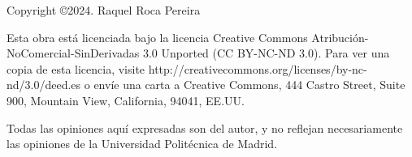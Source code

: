\begin{flushleft}

Copyright \copyright  2024. Raquel Roca Pereira


Esta obra está licenciada bajo la licencia Creative Commons Atribución-NoComercial-SinDerivadas 3.0 Unported (CC BY-NC-ND 3.0). Para ver una copia de esta licencia, visite http://creativecommons.org/licenses/by-nc-nd/3.0/deed.es o envíe una carta a Creative Commons, 444 Castro Street, Suite 900, Mountain View, California, 94041, EE.UU.

Todas las opiniones aquí expresadas son del autor, y no reflejan necesariamente las opiniones
de la Universidad Politécnica de Madrid.

\end{flushleft}